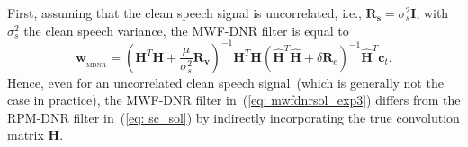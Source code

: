 \documentclass[10pt]{IEEEtran}
\begin{document}
First, assuming that the clean speech signal is uncorrelated, i.e., $\mathbf{R}_{\mathbf{s}} = \sigma_s^2\mathbf{I}$, with $\sigma_s^2$ the clean speech variance, the MWF-DNR filter is equal to
\begin{equation}
\label{eq: mwfdnrsol_exp3}
\mathbf{w}_{_{\text{MDNR}}} = ( \mathbf{H}^T \mathbf{H} + \frac{\mu}{\sigma_s^2} \mathbf{R}_{\mathbf{v}})^{-1}\mathbf{H}^T \mathbf{H}(\hat{\mathbf{H}}^T\hat{\mathbf{H}}+\delta\mathbf{R}_{e})^{-1} \hat{\mathbf{H}}^T\mathbf{c}_{t}. 
\end{equation}
Hence, even for an uncorrelated clean speech signal~(which is generally not the case in practice), the MWF-DNR filter in~(\ref{eq: mwfdnrsol_exp3}) differs from the RPM-DNR filter in~(\ref{eq: sc_sol}) by indirectly incorporating the true convolution matrix $\mathbf{H}$.
\end{document}
